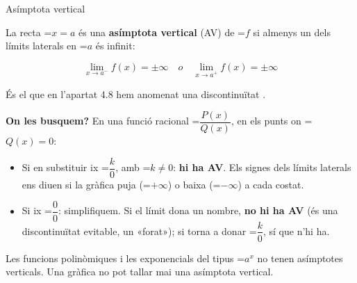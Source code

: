 \documentclass[11pt,a4paper]{article}
\newcommand{\fmm}[1]{\setbox0=\hbox{$#1$}\ifdim\wd0>\linewidth\[#1\]\else\mbox{\box0}\fi}
\newcommand{\fmuline}[1]{\textbf{\color{fmaccent}#1}}
\newcommand{\fmbadge}[2]{\tcbox[on line,colback=#1,colframe=#1,arc=2mm,boxsep=0pt,left=4pt,right=4pt,top=1.5pt,bottom=1.5pt]{\color{white}\footnotesize\bfseries #2}}
\begin{document}
  
\begin{fmdef}{Asímptota vertical}
\par\noindent \begin{minipage}[t]{0.48\linewidth}\vspace{0pt}\raggedright La recta \fmm{x=a} és una \textbf{asímptota vertical} (AV) de \fmm{f} si almenys un dels límits laterals en \fmm{a} és infinit:

          
\[\lim_{x\to a^-}f(x)=\pm\infty\quad o\quad\lim_{x\to a^+}f(x)=\pm\infty\]

          

És el que en l'apartat 4.8 hem anomenat una discontinuïtat \fmbadge{fmas}{asimptòtica}.\end{minipage}\hfill\begin{minipage}[t]{0.48\linewidth}\vspace{0pt}\raggedright \begin{center}\end{center}\end{minipage}\par\medskip

      

\fmuline{On les busquem?} En una funció racional \fmm{\dfrac{P(x)}{Q(x)}}, en els punts on \fmm{Q(x)=0}:

      
\begin{itemize}
\item Si en substituir ix \fmm{\dfrac{k}{0}}, amb \fmm{k\neq0}: \textbf{hi ha AV}. Els signes dels límits laterals ens diuen si la gràfica puja (\fmm{+\infty}) o baixa (\fmm{-\infty}) a cada costat.
\item Si ix \fmm{\dfrac00}: simplifiquem. Si el límit dona un nombre, \textbf{no hi ha AV} (és una discontinuïtat evitable, un «forat»); si torna a donar \fmm{\dfrac k0}, sí que n'hi ha.
\end{itemize}

      
\begin{fmnote}Les funcions polinòmiques i les exponencials del tipus \fmm{a^x} no tenen asímptotes verticals. Una gràfica no pot tallar mai una asímptota vertical.\end{fmnote}
\end{fmdef}
\end{document}
